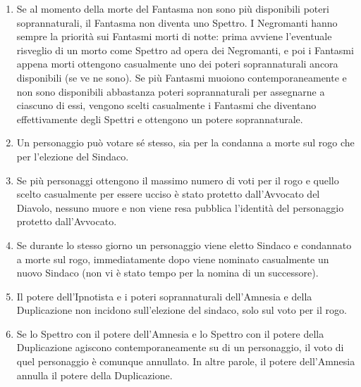 \documentclass[a4paper,10pt]{article}
\begin{document}
\begin{enumerate}
 \item Se al momento della morte del Fantasma non sono più disponibili poteri
soprannaturali, il Fantasma non diventa uno Spettro.
 I Negromanti hanno sempre la priorità sui Fantasmi morti di notte: prima
avviene l'eventuale risveglio di un morto come Spettro ad opera dei Negromanti,
e poi i Fantasmi appena morti ottengono casualmente uno dei poteri
soprannaturali ancora disponibili (se ve ne sono).
 Se più Fantasmi muoiono contemporaneamente e non sono disponibili abbastanza
poteri soprannaturali per assegnarne a ciascuno di essi, vengono scelti
casualmente i Fantasmi che diventano effettivamente degli Spettri e ottengono un
potere soprannaturale.
 
 \item Un personaggio può votare sé stesso, sia per la condanna a morte sul rogo
che per l'elezione del Sindaco.
 \vspace{-4 mm}
 \item Se più personaggi ottengono il massimo numero di voti per il rogo e
quello scelto casualmente per essere ucciso è stato protetto dall'Avvocato del
Diavolo, nessuno muore e non viene resa pubblica l'identità del personaggio
protetto dall'Avvocato.
 
 \item Se durante lo stesso giorno un personaggio viene eletto Sindaco e
condannato a morte sul rogo, immediatamente dopo viene nominato casualmente un
nuovo Sindaco (non vi è stato tempo per la nomina di un successore).
 
 \item Il potere dell'Ipnotista e i poteri soprannaturali dell'Amnesia e della
Duplicazione non incidono sull'elezione del sindaco, solo sul voto per il rogo.
 
 \item Se lo Spettro con il potere dell'Amnesia e lo Spettro con il potere della
Duplicazione agiscono contemporaneamente su di un personaggio, il voto di quel
personaggio è comunque annullato. In altre parole, il potere dell'Amnesia
annulla il potere della Duplicazione.
 

\end{enumerate}
\end{document}
